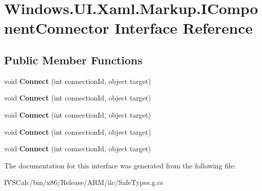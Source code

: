 \hypertarget{interface_windows_1_1_u_i_1_1_xaml_1_1_markup_1_1_i_component_connector}{}\section{Windows.\+U\+I.\+Xaml.\+Markup.\+I\+Component\+Connector Interface Reference}
\label{interface_windows_1_1_u_i_1_1_xaml_1_1_markup_1_1_i_component_connector}
\subsection*{Public Member Functions}
\begin{DoxyCompactItemize}
\item 
\mbox{\label{interface_windows_1_1_u_i_1_1_xaml_1_1_markup_1_1_i_component_connector_a1bf0853c4978bfdda232afb0fea73d24}} 
void {\bfseries Connect} (int connection\+Id, object target)
\item 
\mbox{\label{interface_windows_1_1_u_i_1_1_xaml_1_1_markup_1_1_i_component_connector_a1bf0853c4978bfdda232afb0fea73d24}} 
void {\bfseries Connect} (int connection\+Id, object target)
\item 
\mbox{\label{interface_windows_1_1_u_i_1_1_xaml_1_1_markup_1_1_i_component_connector_a1bf0853c4978bfdda232afb0fea73d24}} 
void {\bfseries Connect} (int connection\+Id, object target)
\item 
\mbox{\label{interface_windows_1_1_u_i_1_1_xaml_1_1_markup_1_1_i_component_connector_a1bf0853c4978bfdda232afb0fea73d24}} 
void {\bfseries Connect} (int connection\+Id, object target)
\item 
\mbox{\label{interface_windows_1_1_u_i_1_1_xaml_1_1_markup_1_1_i_component_connector_a1bf0853c4978bfdda232afb0fea73d24}} 
void {\bfseries Connect} (int connection\+Id, object target)
\end{DoxyCompactItemize}


The documentation for this interface was generated from the following file\+:\begin{DoxyCompactItemize}
\item 
I\+V\+S\+Calc/bin/x86/\+Release/\+A\+R\+M/ilc/Safe\+Types.\+g.\+cs\end{DoxyCompactItemize}
